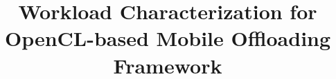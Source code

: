 \documentclass[conference]{IEEEtran}
\begin{document}


%
\title{Workload Characterization for OpenCL-based Mobile Offloading
Framework}


\maketitle
\end{document}
